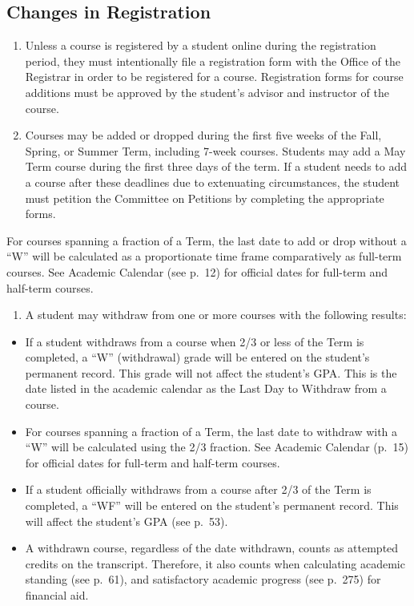 \documentclass[
  letterpaper,
]{scrbook}
\providecommand{\tightlist}{%
  \setlength{\itemsep}{0pt}\setlength{\parskip}{0pt}}
\begin{document}
\subsection{Changes in Registration}\label{changes-in-registration}

\begin{enumerate}
\def\labelenumi{\arabic{enumi}.}
\tightlist
\item
  Unless a course is registered by a student online during the
  registration period, they must intentionally file a registration form
  with the Office of the Registrar in order to be registered for a
  course. Registration forms for course additions must be approved by
  the student's advisor and instructor of the course.
\item
  Courses may be added or dropped during the first five weeks of the
  Fall, Spring, or Summer Term, including 7-week courses. Students may
  add a May Term course during the first three days of the term. If a
  student needs to add a course after these deadlines due to extenuating
  circumstances, the student must petition the Committee on Petitions by
  completing the appropriate forms.
\end{enumerate}

For courses spanning a fraction of a Term, the last date to add or drop
without a ``W'' will be calculated as a proportionate time frame
comparatively as full-term courses. See Academic Calendar (see p.~12)
for official dates for full-term and half-term courses.

\begin{enumerate}
\def\labelenumi{\arabic{enumi}.}
\setcounter{enumi}{2}
\tightlist
\item
  A student may withdraw from one or more courses with the following
  results:
\end{enumerate}

\begin{itemize}
\tightlist
\item
  If a student withdraws from a course when 2/3 or less of the Term is
  completed, a ``W'' (withdrawal) grade will be entered on the student's
  permanent record. This grade will not affect the student's GPA. This
  is the date listed in the academic calendar as the Last Day to
  Withdraw from a course.\\
\item
  For courses spanning a fraction of a Term, the last date to withdraw
  with a ``W'' will be calculated using the 2/3 fraction. See Academic
  Calendar (p.~15) for official dates for full-term and half-term
  courses.
\item
  If a student officially withdraws from a course after 2/3 of the Term
  is completed, a ``WF'' will be entered on the student's permanent
  record. This will affect the student's GPA (see p.~53).
\item
  A withdrawn course, regardless of the date withdrawn, counts as
  attempted credits on the transcript. Therefore, it also counts when
  calculating academic standing (see p.~61), and satisfactory academic
  progress (see p.~275) for financial aid.
\end{itemize}
\end{document}
